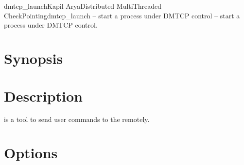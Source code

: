 

\begin{Name}{1}{dmtcp\_launch}{Kapil Arya}{Distributed MultiThreaded CheckPointing}{dmtcp\_launch -- start a process under DMTCP control}
   -- start a process under DMTCP control.
\end{Name}

\section{Synopsis}

   

\section{Description}

 is a tool to send user commands to the
 remotely.

\section{Options}

